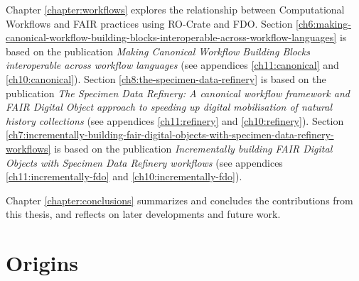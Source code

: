 Chapter \vref{chapter:workflows} explores the relationship between Computational Workflows and FAIR practices using RO-Crate and FDO. 
Section \vref{ch6:making-canonical-workflow-building-blocks-interoperable-across-workflow-languages} is based on the publication \emph{Making Canonical Workflow Building Blocks interoperable across workflow languages} \cite{Soiland-Reyes 2022a} (see appendices \ref{ch11:canonical} and \ref{ch10:canonical}). 
Section \vref{ch8:the-specimen-data-refinery} is based on the publication \emph{The Specimen Data Refinery: A
canonical workflow framework and FAIR Digital Object approach to speeding up digital mobilisation of natural history collections} \cite{Hardisty 2022} (see appendices \ref{ch11:refinery} and \ref{ch10:refinery}).
Section \vref{ch7:incrementally-building-fair-digital-objects-with-specimen-data-refinery-workflows} is based on the publication \emph{Incrementally building FAIR Digital Objects with Specimen Data
Refinery workflows} \cite{Woolland 2022} (see appendices \ref{ch11:incrementally-fdo} and \ref{ch10:incrementally-fdo}).

Chapter \vref{chapter:conclusions} summarizes and concludes the contributions from this thesis, and reflects on later developments and future work.


\section{Origins}
